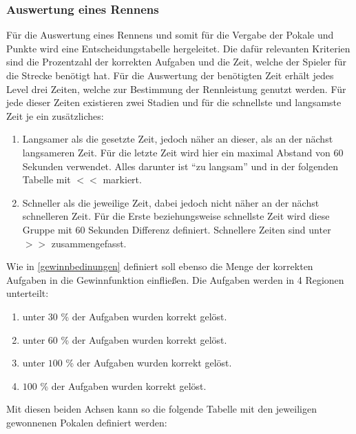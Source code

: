 	\subsubsection{Auswertung eines Rennens}
	Für die Auswertung eines Rennens und somit für die Vergabe der Pokale und Punkte wird  eine Entscheidungstabelle hergeleitet. Die dafür relevanten Kriterien sind die Prozentzahl der korrekten Aufgaben und die Zeit, welche der Spieler für die Strecke benötigt hat.
	Für die Auswertung der benötigten Zeit erhält jedes Level drei Zeiten, welche zur Bestimmung der Rennleistung genutzt werden. Für jede dieser Zeiten existieren zwei Stadien und für die schnellste und langsamste Zeit je ein zusätzliches:
	\begin{enumerate}
		\item{ Langsamer als die gesetzte Zeit, jedoch näher an dieser, als an der nächst langsameren Zeit. Für die letzte Zeit wird hier ein maximal Abstand von $60$ Sekunden verwendet. Alles darunter ist \enquote{zu langsam} und in der folgenden Tabelle mit $<<$ markiert. }
		\item{ Schneller als die jeweilige Zeit, dabei jedoch nicht näher an der nächst schnelleren Zeit. Für die Erste beziehungsweise schnellste Zeit wird diese Gruppe mit $60$ Sekunden Differenz definiert. Schnellere Zeiten sind unter $>>$ zusammengefasst. }
	\end{enumerate}
	Wie in \ref{gewinnbedinungen} definiert soll ebenso die Menge der korrekten Aufgaben in die Gewinnfunktion einfließen. Die Aufgaben werden in 4 Regionen unterteilt:
	\begin{enumerate}
		\item{ unter $30$ \% der Aufgaben wurden korrekt gelöst. }
		\item{ unter $60$ \% der Aufgaben wurden korrekt gelöst. }
		\item{ unter $100$ \% der Aufgaben wurden korrekt gelöst. }
		\item{ $100$ \% der Aufgaben wurden korrekt gelöst. }
	\end{enumerate}
	Mit diesen beiden Achsen kann so die folgende Tabelle mit den jeweiligen gewonnenen Pokalen definiert werden:

